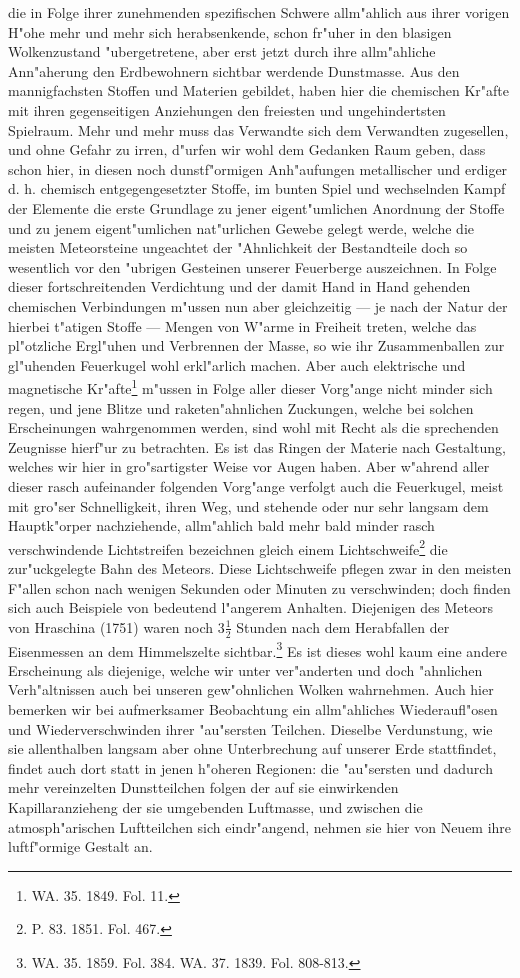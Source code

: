 \documentclass[a4paper, 8pt, oneside, polutonikogreek, german]{article}
\begin{document}
die in Folge ihrer zunehmenden spezifischen Schwere allm"ahlich aus ihrer vorigen H"ohe mehr und mehr sich herabsenkende, schon fr"uher in den blasigen Wolkenzustand "ubergetretene, aber erst jetzt durch ihre allm"ahliche Ann"aherung den Erdbewohnern sichtbar werdende Dunstmasse. Aus den mannigfachsten Stoffen und Materien gebildet, haben hier die chemischen Kr"afte mit ihren gegenseitigen Anziehungen den freiesten und ungehindertsten Spielraum. Mehr und mehr muss das Verwandte sich dem Verwandten zugesellen, und ohne Gefahr zu irren, d"urfen wir wohl dem Gedanken Raum geben, dass schon hier, in diesen noch dunstf"ormigen Anh"aufungen metallischer und erdiger d. h. chemisch entgegengesetzter Stoffe, im bunten Spiel und wechselnden Kampf der Elemente die erste Grundlage zu jener eigent"umlichen Anordnung der Stoffe und zu jenem eigent"umlichen nat"urlichen Gewebe gelegt werde, welche die meisten Meteorsteine ungeachtet der "Ahnlichkeit der Bestandteile doch so wesentlich vor den "ubrigen Gesteinen unserer Feuerberge auszeichnen. In Folge dieser fortschreitenden Verdichtung und der damit Hand in Hand gehenden chemischen Verbindungen m"ussen nun aber gleichzeitig --- je nach der Natur der hierbei t"atigen Stoffe --- Mengen von W"arme in Freiheit treten, welche das pl"otzliche Ergl"uhen und Verbrennen der Masse, so wie ihr Zusammenballen zur gl"uhenden Feuerkugel wohl erkl"arlich machen. Aber auch elektrische und magnetische Kr"afte\footnote{WA. 35. 1849. Fol. 11.} m"ussen in Folge aller dieser Vorg"ange nicht minder sich regen, und jene Blitze und raketen"ahnlichen Zuckungen, welche bei solchen Erscheinungen wahrgenommen werden, sind wohl mit Recht als die sprechenden Zeugnisse hierf"ur zu betrachten. Es ist das Ringen der Materie nach Gestaltung, welches wir hier in gro"sartigster Weise vor Augen haben. Aber w"ahrend aller dieser rasch aufeinander folgenden Vorg"ange verfolgt auch die Feuerkugel, meist mit gro"ser Schnelligkeit, ihren Weg, und stehende oder nur sehr langsam dem Hauptk"orper nachziehende, allm"ahlich bald mehr bald minder rasch verschwindende Lichtstreifen bezeichnen gleich einem Lichtschweife\footnote{P. 83. 1851. Fol. 467.} die zur"uckgelegte Bahn des Meteors. Diese Lichtschweife pflegen zwar in den meisten F"allen schon nach wenigen Sekunden oder Minuten zu verschwinden; doch finden sich auch Beispiele von bedeutend l"angerem Anhalten. Diejenigen des Meteors von Hraschina (1751) waren noch $3\frac{1}{2}$ Stunden nach dem Herabfallen der Eisenmessen an dem Himmelszelte sichtbar.\footnote{WA. 35. 1859. Fol. 384. WA. 37. 1839. Fol. 808-813.} Es ist dieses wohl kaum eine andere Erscheinung als diejenige, welche wir unter ver"anderten und doch "ahnlichen Verh"altnissen auch bei unseren gew"ohnlichen Wolken wahrnehmen. Auch hier bemerken wir bei aufmerksamer Beobachtung ein allm"ahliches Wiederaufl"osen und Wiederverschwinden ihrer "au"sersten Teilchen. Dieselbe Verdunstung, wie sie allenthalben langsam aber ohne Unterbrechung auf unserer Erde stattfindet, findet auch dort statt in jenen h"oheren Regionen: die "au"sersten und dadurch mehr vereinzelten Dunstteilchen folgen der auf sie einwirkenden Kapillaranzieheng der sie umgebenden Luftmasse, und zwischen die atmosph"arischen Luftteilchen sich eindr"angend, nehmen sie hier von Neuem ihre luftf"ormige Gestalt an. 
\end{document}
